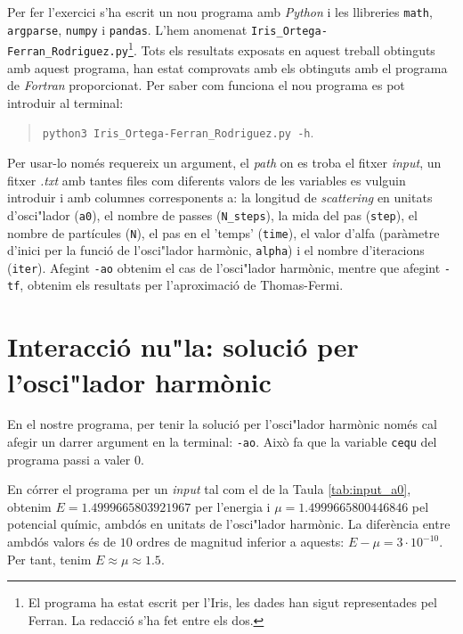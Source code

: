 \documentclass[a4paper]{article}
\begin{document}
Per fer l'exercici s'ha escrit un nou programa amb \textit{Python} i les llibreries \texttt{math}, \texttt{argparse}, \texttt{numpy} i \texttt{pandas}. L'hem anomenat \texttt{Iris\_Ortega-Ferran\_Rodriguez.py}\footnote{El programa ha estat escrit per l'Iris, les dades han sigut representades pel Ferran. La redacció s'ha fet entre els dos.}. Tots els resultats exposats en aquest treball obtinguts amb aquest programa, han estat comprovats amb els obtinguts amb el programa de \textit{Fortran} proporcionat. Per saber com funciona el nou programa es pot introduir al terminal:
\begin{quote}
    \texttt{python3 Iris\_Ortega-Ferran\_Rodriguez.py -h}.
\end{quote}
Per usar-lo només requereix un argument, el \textit{path} on es troba el fitxer \textit{input}, un fitxer \textit{.txt} amb tantes files com diferents valors de les variables es vulguin introduir i amb columnes corresponents a: la longitud de \textit{scattering} en unitats d'osci"lador (\texttt{a0}), el nombre de passes (\texttt{N\_steps}), la mida del pas (\texttt{step}), el nombre de partícules (\texttt{N}), el pas en el 'temps' (\texttt{time}), el valor d'alfa (paràmetre d'inici per la funció de l'osci"lador harmònic, \texttt{alpha}) i el nombre d'iteracions (\texttt{iter}). Afegint \texttt{-ao} obtenim el cas de l'osci"lador harmònic, mentre que afegint \texttt{-tf}, obtenim els resultats per l'aproximació de Thomas-Fermi.






\section{\bf Interacció nu"la: solució per l'osci"lador harmònic}


En el nostre programa, per tenir la solució per l'osci"lador harmònic només cal afegir un darrer argument en la terminal: \texttt{-ao}. Això fa que la variable \texttt{cequ} del programa passi a valer $0$.

En córrer el programa per un \textit{input} tal com el de la Taula \ref{tab:input_a0}, obtenim $E=1.4999665803921967$ per l'energia i $\mu=1.4999665800446846$ pel potencial químic, ambdós en unitats de l'osci"lador harmònic. La diferència entre ambdós valors és de $10$ ordres de magnitud inferior a aquests: $E-\mu=3\cdot10^{-10}$. Per tant, tenim $E\approx \mu\approx 1.5$. 
\end{document}
